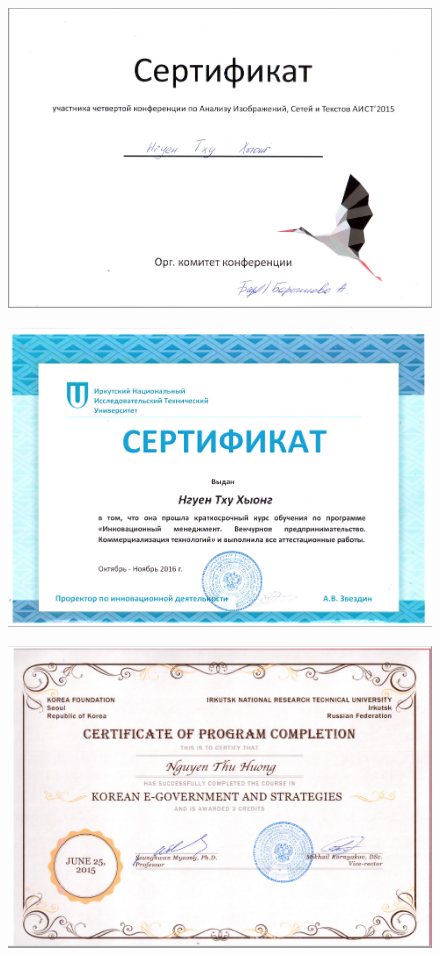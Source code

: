 \begin{figure}[ht!]
\centering
\includegraphics [width=0.8\linewidth] {images/p28.png}\label{imgp28}
\end{figure}
\begin{figure}[ht!]
\centering
\includegraphics [width=0.8\linewidth] {images/p30.png}\label{imgp30}
\end{figure}
\begin{figure}[ht!]
\centering
\includegraphics [width=0.8\linewidth] {images/p26.png}\label{imgp26}
\end{figure}
